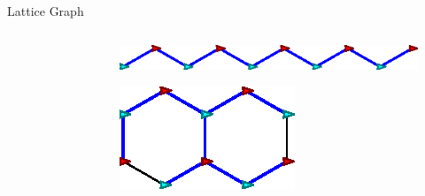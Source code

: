 \documentclass[10pt]{beamer}
\begin{document}
\begin{frame}{Lattice Graph}
\begin{block}{}
\begin{columns}[T]
\begin{column}{.4\textwidth}
\begin{figure}
      \end{figure}
    \end{column}%
    \begin{column}{.5\textwidth}
      \begin{figure}
        \centering
        \includegraphics[width=\linewidth]{figs/bad-hexagon}
      \end{figure}
      \begin{figure}
        \centering
        \includegraphics[scale=1]{figs/good-hexagon}
        \end{figure}
    \end{column}%
  \end{columns}
\end{block}
\end{frame}
\end{document}
